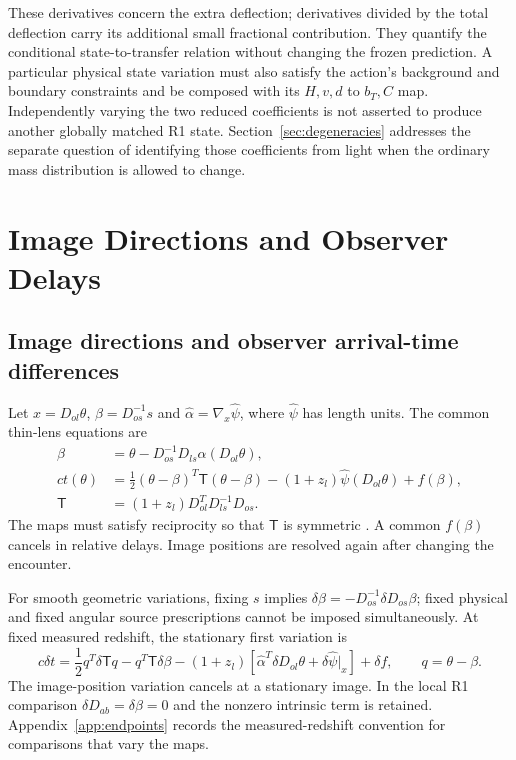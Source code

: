 These derivatives concern the extra deflection; derivatives divided by
the total deflection carry its additional small fractional contribution.
They quantify the conditional state-to-transfer relation without
changing the frozen prediction. A particular physical state variation
must also satisfy the action's background and boundary constraints and
be composed with its $H,v,d$ to $b_T,C$ map. Independently varying the
two reduced coefficients is not asserted to produce another globally
matched R1 state. Section~\ref{sec:degeneracies} addresses the separate
question of identifying those coefficients from light when the ordinary
mass distribution is allowed to change.

\section{Image Directions and Observer Delays}
\label{sec:results}
\subsection{Image directions and observer arrival-time differences}
Let $x=D_{ol}\theta$, $\beta=D_{os}^{-1}s$ and
$\hat\alpha=\nabla_x\hat\psi$, where $\hat\psi$ has length units.
The common thin-lens equations are
\begin{align}
 \beta&=\theta-D_{os}^{-1}D_{ls}\hat\alpha(D_{ol}\theta),\label{eq:image}\\
 ct(\theta)&=\frac12(\theta-\beta)^T\mathsf T(\theta-\beta)
 -(1+z_l)\hat\psi(D_{ol}\theta)+f(\beta),\nonumber\\
 \mathsf T&=(1+z_l)D_{ol}^{T}D_{ls}^{-1}D_{os}.
 \label{eq:arrival}
\end{align}
The maps must satisfy reciprocity so that $\mathsf T$ is symmetric
\citep{Fleury2021arbitrary}. A common $f(\beta)$ cancels in relative delays.
Image positions are resolved again after changing the encounter.

For smooth geometric variations, fixing $s$ implies
$\delta\beta=-D_{os}^{-1}\delta D_{os}\beta$; fixed physical and fixed
angular source prescriptions cannot be imposed simultaneously.
At fixed measured redshift, the stationary first variation is
\begin{equation}
 c\delta t=
 \frac12 q^T\delta\mathsf Tq-q^T\mathsf T\delta\beta
 -(1+z_l)\left[\hat\alpha^T\delta D_{ol}\theta+
 \delta\hat\psi|_x\right]+\delta f,\qquad q=\theta-\beta .
 \label{eq:variation}
\end{equation}
The image-position variation cancels at a stationary image.
In the local R1 comparison $\delta D_{ab}=\delta\beta=0$ and the
nonzero intrinsic term is retained. Appendix~\ref{app:endpoints}
records the measured-redshift convention for comparisons that vary
the maps.

